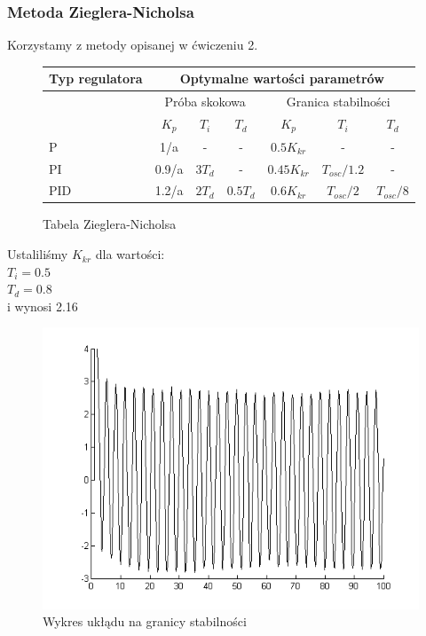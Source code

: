 \documentclass[a4paper,10pt]{article}
\begin{document}
\subsubsection{Metoda Zieglera-Nicholsa}\label{sec:Mzn}
Korzystamy z metody opisanej w ćwiczeniu 2.
\begin{figure}[!h]
\begin{tabular}{ | l | c | c | c | c | c | c | }
\hline
  Typ regulatora & \multicolumn{6}{|c|}{Optymalne wartości parametrów} \\   \hline
   & \multicolumn{3}{|c|}{Próba skokowa} & \multicolumn{3}{|c|}{Granica stabilności} \\   \hline
   & $K_{p}$ & $T_{i}$ & $T_{d}$ & $K_{p}$ & $T_{i}$ & $T_{d}$\\   \hline
   P & 1/a & - & - & $0.5K_{kr}$ & - & - \\   \hline
   PI & 0.9/a & $3 T_{d}$ & - & $0.45K_{kr}$ & $T_{osc}/1.2$ & - \\   \hline
   PID & 1.2/a & $2T_{d}$ & $0.5T_d$ & $0.6K_{kr}$ & $T_{osc}/2$ & $T_{osc}/8$ \\   \hline
\hline
\end{tabular}
	\caption{Tabela Zieglera-Nicholsa}
\end{figure}
Ustaliliśmy $K_{kr}$ dla wartości:\\
$T_i = 0.5$\\
$T_d = 0.8$ \\
i wynosi 2.16

\begin{figure}[!h]
    \centering
	\includegraphics[width=120mm]{CW5-ZN-gs.png}
	\caption{Wykres ukłądu na granicy stabilności}
    \label{fig:symulacjaP}
\end{figure}
\end{document}
